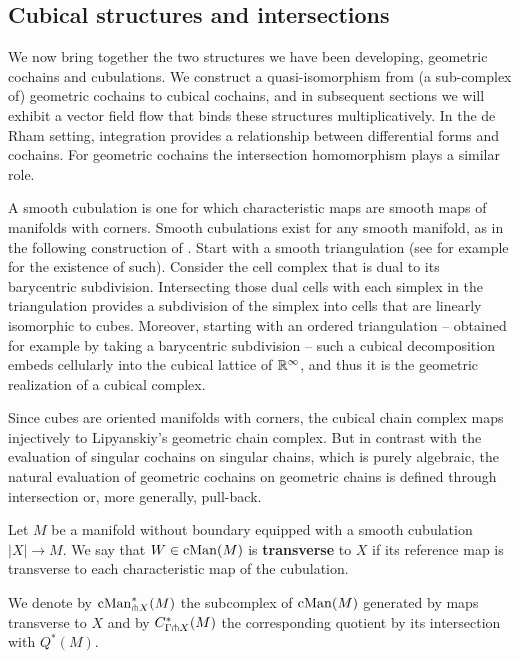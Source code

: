 \subsection{Cubical structures and intersections}

We now bring together the two structures we have been developing, geometric cochains and cubulations.
We construct a quasi-isomorphism from (a sub-complex of) geometric cochains to cubical cochains, and in subsequent sections we will exhibit a vector field flow that binds these structures multiplicatively.
In the de Rham setting, integration provides a relationship between differential forms and cochains.
For geometric cochains the intersection homomorphism plays a similar role.

A smooth cubulation is one for which characteristic maps are smooth maps of manifolds with corners.
Smooth cubulations exist for any smooth manifold, as in the following construction of \cite{ShSh92}.
Start with a smooth triangulation (see for example \cite[Theorem 10.6]{Munk66} for the existence of such).
Consider the cell complex that is dual to its barycentric subdivision. Intersecting those dual cells with each simplex in the triangulation provides a subdivision of the simplex into cells that are linearly isomorphic to cubes.
Moreover, starting with an ordered triangulation -- obtained for example by taking a barycentric subdivision -- such a cubical decomposition embeds cellularly into the cubical lattice of $\mathbb{R}^\infty$, and thus it is the geometric realization of a cubical complex.

Since cubes are oriented manifolds with corners, the cubical chain complex maps injectively to Lipyanskiy's geometric chain complex.
But in contrast with the evaluation of singular cochains on singular chains, which is purely algebraic, the natural evaluation of geometric cochains on geometric chains is defined through intersection or, more generally, pull-back.

\begin{definition}
	Let $M$ be a manifold without boundary equipped with a smooth cubulation $|X| \to M$.
	We say that $W \in \mathrm{cMan}(M)$ is \textbf{transverse} to $X$ if its reference map is transverse to each characteristic map of the cubulation.

	We denote by $\mathrm{cMan}_{\pitchfork X}^*(M)$ the subcomplex of $\mathrm{cMan}(M)$ generated by maps transverse to $X$ and by $C^*_{\Gamma \pitchfork X}(M)$ the corresponding quotient by its intersection with $Q^*(M)$.
\end{definition}


